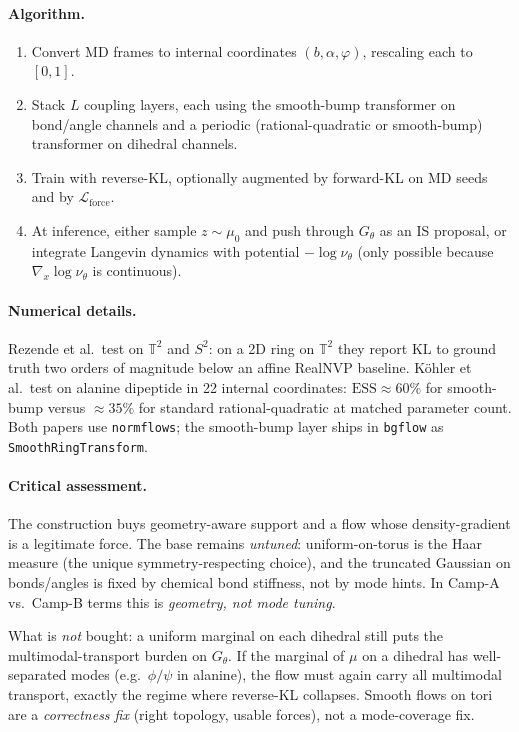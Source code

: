 \documentclass[11pt,letterpaper]{article}
\newcommand{\KLdiv}{\mathrm{KL}}
\newcommand{\ESS}{\mathrm{ESS}}
\theoremstyle{plain}
\begin{document}
\paragraph{Algorithm.}
\begin{enumerate}\setlength{\itemsep}{2pt}
  \item Convert MD frames to internal coordinates $(b,\alpha,\varphi)$, rescaling each to $[0,1]$.
  \item Stack $L$ coupling layers, each using the smooth-bump transformer on bond/angle channels and a periodic (rational-quadratic or smooth-bump) transformer on dihedral channels.
  \item Train with reverse-KL, optionally augmented by forward-KL on MD seeds and by $\mathcal L_{\mathrm{force}}$.
  \item At inference, either sample $z\sim\mu_0$ and push through $G_\theta$ as an IS proposal, or integrate Langevin dynamics with potential $-\log\nu_\theta$ (only possible because $\nabla_x\log\nu_\theta$ is continuous).
\end{enumerate}

\paragraph{Numerical details.} Rezende et al.\ test on $\mathbb T^2$ and $S^2$: on a 2D ring on $\mathbb T^2$ they report $\KLdiv$ to ground truth two orders of magnitude below an affine RealNVP baseline. Köhler et al.\ test on alanine dipeptide in 22 internal coordinates: $\ESS\approx 60\%$ for smooth-bump versus $\approx 35\%$ for standard rational-quadratic at matched parameter count. Both papers use \texttt{normflows}; the smooth-bump layer ships in \texttt{bgflow} as \verb|SmoothRingTransform|.

\paragraph{Critical assessment.} The construction buys geometry-aware support and a flow whose density-gradient is a legitimate force. The base remains \emph{untuned}: uniform-on-torus is the Haar measure (the unique symmetry-respecting choice), and the truncated Gaussian on bonds/angles is fixed by chemical bond stiffness, not by mode hints. In Camp-A vs.\ Camp-B terms this is \emph{geometry, not mode tuning}.

What is \emph{not} bought: a uniform marginal on each dihedral still puts the multimodal-transport burden on $G_\theta$. If the marginal of $\mu$ on a dihedral has well-separated modes (e.g.\ $\phi/\psi$ in alanine), the flow must again carry all multimodal transport, exactly the regime where reverse-KL collapses. Smooth flows on tori are a \emph{correctness fix} (right topology, usable forces), not a mode-coverage fix.
\end{document}
